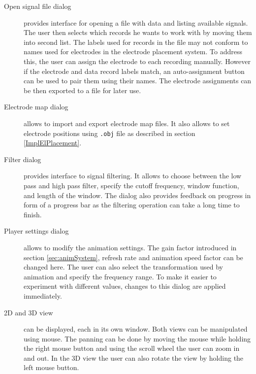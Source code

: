 \begin{description}
	\item[Open signal file dialog] provides interface for opening a file with data and listing available signals. The user then selects which records he wants to work with by moving them into second list. The labels used for records in the file may not conform to names used for electrodes in the electrode placement system. To address this, the user can assign the electrode to each recording manually. However if the electrode and data record labels match, an auto-assignment button can be used to pair them using their names. The electrode assignments can be then exported to a file for later use.
	
	\item[Electrode map dialog] allows to import and export electrode map files. It also allows to set electrode positions using \texttt{.obj} file as described in section \ref{ImplElPlacement}.
	
	\item[Filter dialog] provides interface to signal filtering. It allows to choose between the low pass and high pass filter, specify the cutoff frequency, window function, and length of the window. The dialog also provides feedback on progress in form of a progress bar as the filtering operation can take a long time to finish.
	
	\item[Player settings dialog] allows to modify the animation settings. The gain factor introduced in section \ref{sec:animSystem}, refresh rate and animation speed factor can be changed here. The user can also select the transformation used by animation and specify the frequency range. To make it easier to experiment with different values, changes to this dialog are applied immediately.
	
	\item[2D and 3D view] can be displayed, each in its own window. Both views can be manipulated using mouse. The panning can be done by moving the mouse while holding the right mouse button and using the scroll wheel the user can zoom in and out. In the 3D view the user can also rotate the view by holding the left mouse button.
\end{description}


